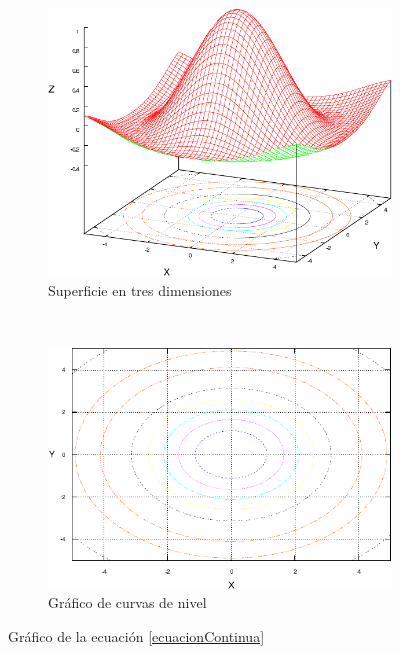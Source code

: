 \begin{figure}[h]

	\begin{subfigure}[b]{0.45\textwidth}
		\centering
		\includegraphics[width=\textwidth]{images/misc/contour_1_using_eps2eps.pdf}
		\caption{Superficie en tres dimensiones}
		\label{c:flujo:superficieEnTresDimensiones}
	\end{subfigure}
	~~
	\begin{subfigure}[b]{0.45\textwidth}
		\centering
		\includegraphics[width=\textwidth]{images/misc/contour_2_using_eps2eps.pdf}
		\caption{Gráfico de curvas de nivel}
		\label{c:flujo:graficoDeCurvasDeNivel}
	\end{subfigure}

	\caption{Gráfico de la ecuación \ref{ecuacionContinua}}
	\label{c:flujo:greaficoDeLaEcuacion}

\end{figure}

